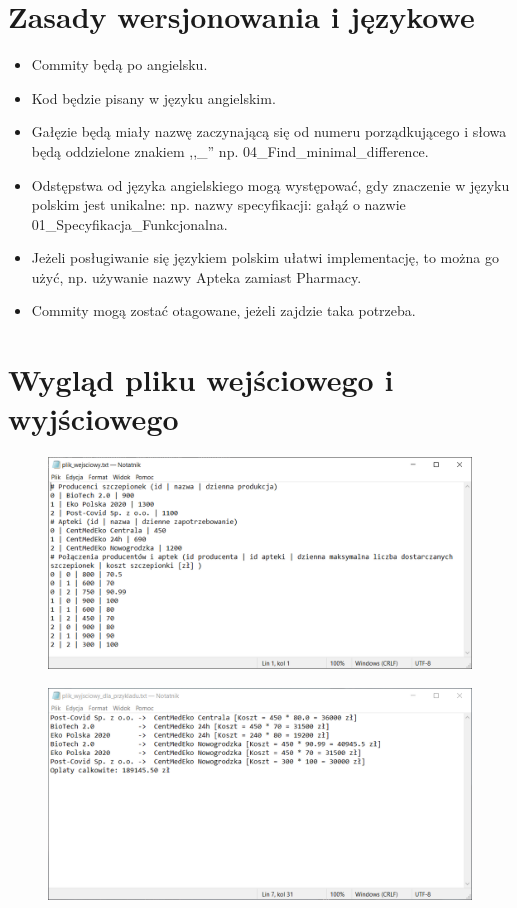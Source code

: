 \documentclass{article}
\begin{document}
\clearpage

\section{Zasady wersjonowania i językowe}
\begin{itemize}
    \item Commity będą po angielsku.
    \item Kod będzie pisany w języku angielskim.
    \item Gałęzie będą miały nazwę zaczynającą się od numeru porządkującego i słowa będą oddzielone znakiem ,,\_'' np. 04\_Find\_minimal\_difference.
    \item Odstępstwa od języka angielskiego mogą występować, gdy znaczenie w języku polskim jest unikalne: np. nazwy specyfikacji: gałąź o nazwie 01\_Specyfikacja\_Funkcjonalna.
    \item Jeżeli posługiwanie się językiem polskim ułatwi implementację, to można go użyć, np. używanie nazwy Apteka zamiast Pharmacy.
    \item Commity mogą zostać otagowane, jeżeli zajdzie taka potrzeba.
\end{itemize}

\section{Wygląd pliku wejściowego i wyjściowego}

\begin{figure} [hbt!]
    \includegraphics[width=15cm,center]{images/plik_wejsciowy.PNG}
\end{figure}

\begin{figure} [hbt!]
    \includegraphics[width=15cm,center]{images/plik_wyjsciowy_dla_przykladu.PNG}
\end{figure}
\end{document}
